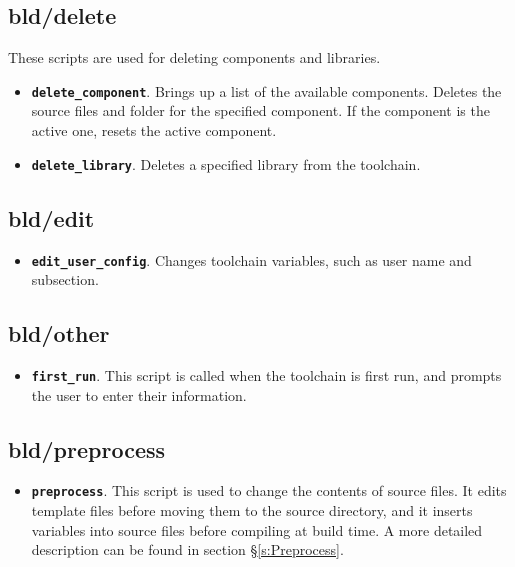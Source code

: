 \documentclass[a4paper, oneside, 11pt, titlepage, onecolumn, openright]{report}
\begin{document}
\subsection{bld/delete}
			\label{ss:bld/delete}
			These scripts are used for deleting components and libraries.
\begin{itemize}

\item \textbf{\texttt{delete\_component}}. Brings up a list of the available components. Deletes the source files and folder for the specified component. If the component is the active one, resets the active component.

\item \textbf{\texttt{delete\_library}}. Deletes a specified library from the toolchain.

\end{itemize}

\subsection{bld/edit}
			\label{ss:bld/edit}
\begin{itemize}

\item \textbf{\texttt{edit\_user\_config}}. Changes toolchain variables, such as user name and subsection.

\end{itemize}

\subsection{bld/other}
			\label{ss:bld/other}
\begin{itemize}

\item \textbf{\texttt{first\_run}}. This script is called when the toolchain is first run, and prompts the user to enter their information.

\end{itemize}

\subsection{bld/preprocess}
			\label{ss:bld/preprocess}
\begin{itemize}

\item \textbf{\texttt{preprocess}}. This script is used to change the contents of source files. It edits template files before moving them to the source directory, and it inserts variables into source files before compiling at build time. A more detailed description can be found in section \S\ref{s:Preprocess}.

\end{itemize}
\end{document}
